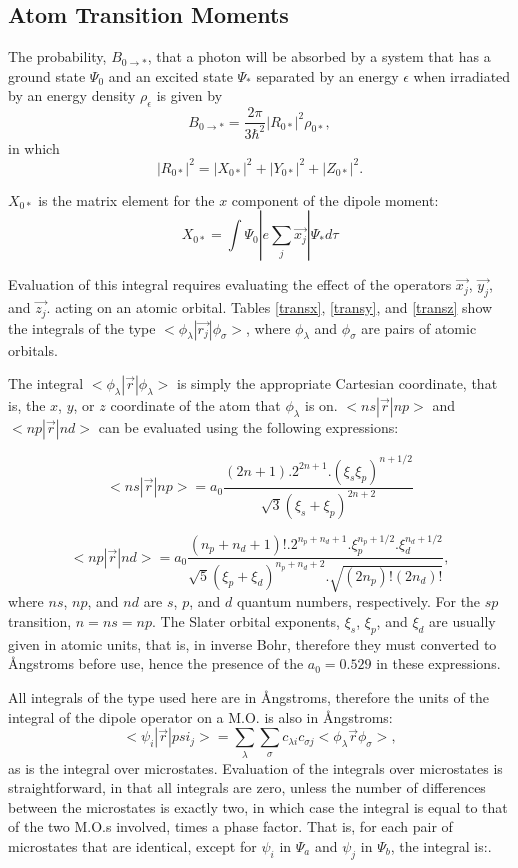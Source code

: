 \subsection{Atom Transition Moments}
The probability, $B_{0\rightarrow *}$, that a photon will be absorbed by a system that has a
ground state $\Psi_0$ and an excited state $\Psi_*$ separated by an energy $\epsilon$ when
irradiated by an energy density $\rho_{\epsilon}$
is given by
$$
B_{0\rightarrow *} = \frac{2\pi}{3\hbar^2}|R_{0*}|^2\rho_{0*},
$$
in which
$$
|R_{0*}|^2 = |X_{0*}|^2 + |Y_{0*}|^2 + |Z_{0*}|^2.
$$

$X_{0*}$ is the matrix element for the $x$ component of the dipole moment:
$$
X_{0*} = \int \Psi_0|e\sum_j \vec{x_j} |\Psi_* d\tau
$$

Evaluation of this integral requires evaluating the effect of the operators  $\vec{x_j}$,
$\vec{y_j}$, and $\vec{z_j}$.
acting on an atomic orbital.  Tables \ref{transx}, \ref{transy}, and \ref{transz} show
the integrals of the type $<\! \phi_{\lambda}
 |\vec{r_j}|\phi_{\sigma}\!>$, where $\phi_{\lambda}$ and $\phi_{\sigma}$ are
 pairs of atomic orbitals.



The integral
 $<\! \phi_{\lambda}|\vec{r}|\phi_{\lambda}\! >$ is simply the appropriate Cartesian coordinate,
that is, the $x$, $y$, or $z$ coordinate of the atom that $\phi_{\lambda}$ is on. $<\! ns|\vec{r}|np\! >$
 and  $<\! np|\vec{r}|nd\! >$
 can be evaluated using the following expressions:

$$
<\! ns|\vec{r}|np\! > = a_0\frac{(2n+1).2^{2n+1}.(\xi_s\xi_p)^{n+1/2}}{\sqrt{3}(\xi_s+\xi_p)^{2n+2}}
$$

$$
<np|\vec{r}|nd>=a_0\frac{(n_p+n_d+1)!.2^{n_p+n_d+1}.\xi_p^{n_p+1/2}.\xi_d^{n_d+1/2}}
{\sqrt{5}(\xi_p+\xi_d)^{n_p+n_d+2}.\sqrt{(2n_p)!(2n_d)!}},
$$
where $ns$, $np$, and $nd$ are $s$, $p$, and $d$ quantum numbers, respectively.
For the $sp$ transition, $n=ns=np$.
The Slater orbital exponents, $\xi_s$, $\xi_p$, and $\xi_d$ are usually
given in atomic units, that is, in
inverse Bohr, therefore they must converted to \AA ngstroms before use, hence the
presence of the $a_0=0.529$ in these expressions.

All integrals of the type used here are in \AA ngstroms, therefore the units of the integral
of the dipole operator on a M.O. is also in \AA ngstroms:
$$
<\! \psi_i|\vec{r}|psi_j\! > =\sum_{\lambda}\sum_{\sigma}c_{\lambda i}c_{\sigma j}
<\! \phi_{\lambda}\vec{r}\phi_{\sigma} \!>,
$$
as is the integral over microstates.  Evaluation of the integrals over microstates is straightforward,
in that all integrals are zero, unless the number of differences between the microstates is exactly two,
in which case the integral is equal to that of the two M.O.s involved, times a phase factor.  That is,
for each pair of microstates that are identical, except for $\psi_i$
in $\Psi_a$ and  $\psi_j$ in $\Psi_b$, the integral is:.

